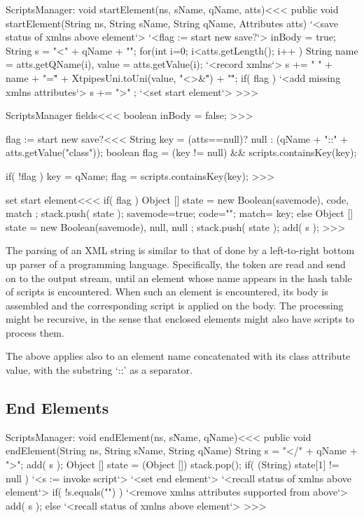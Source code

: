 \documentclass{article}
\begin{document}
\<ScriptsManager: void startElement(ns, sName, qName, atts)\><<<
public void startElement(String ns, String sName,
                        String qName, Attributes atts) {
   `<save status of xmlns above element`>
   `<flag := start new save?`>
   inBody = true;
   String s =  "<" + qName + "\n";
   for(int i=0; i<atts.getLength(); i++ ){
      String name = atts.getQName(i),
             value = atts.getValue(i);
      `<record xmlns`>
      s += " " + name + "=\"" +
         XtpipesUni.toUni(value, "<>&\"") + "\"";
   }
   if( flag ){ `<add missing xmlns attributes`> }
   s += ">" ;
   `<set start element`>
}
>>>


\<ScriptsManager fields\><<<
boolean inBody = false;
>>>


\<flag := start new save?\><<<
String key = (atts==null)?
               null
             : (qName + "::" + atts.getValue("class"));
boolean flag = (key != null) && scripts.containsKey(key);

if( !flag ){
   key = qName;
   flag = scripts.containsKey(key);
}
>>>

\<set start element\><<<
if( flag ){
   Object [] state = { new Boolean(savemode), code, match };
   stack.push( state );
   savemode=true; code=""; match= key;
} else {
   Object [] state = { new Boolean(savemode), null, null };
   stack.push( state );
}
add( s );
>>>

The parsing of an XML string is similar to that of done by a
left-to-right bottom up parser of a programming language.
Specifically, the token are read and send on to the output stream,
until an element whose name appears in the hash table of scripts is
encountered.  When such an element is encountered, its body is
assembled and the corresponding script is applied on the body.  The
processing might be recursive, in the sense that enclosed elements
might also have scripts to process them.

The above applies also to an element name concatenated with its class
attribute value, with the substring `::' as a separator.

\subsection{End Elements}



\<ScriptsManager: void endElement(ns, sName, qName)\><<<
public void endElement(String ns, String sName, String qName){
   String s = "</" + qName + ">";
   add( s );
   Object [] state = (Object []) stack.pop();
   if( (String) state[1] != null ){
     `<s := invoke script`>
     `<set end element`>
     `<recall status of xmlns above element`>
     if( !s.equals("") ){
       `<remove xmlns attributes supported from above`>
       add( s );
     }
   } else { `<recall status of xmlns above element`> }
}
>>>
\end{document}
